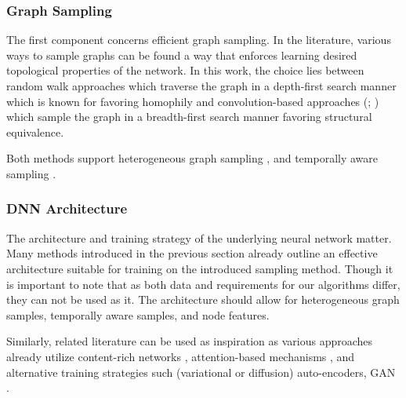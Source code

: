 \documentclass[
acmsmall,
nonacm,
screen,
acmthm]{../../scripts/pandoc/templates/acmart}
\begin{document}
\hypertarget{graph-sampling}{%
\subsubsection{Graph Sampling}\label{graph-sampling}}

The first component concerns efficient graph sampling. In the
literature, various ways to sample graphs can be found a way that
enforces learning desired topological properties of the network. In this
work, the choice lies between random walk approaches
\citep{perozziDeepWalkOnlineLearning2014, groverNode2vecScalableFeature2016, groverNode2vecScalableFeature2016}
which traverse the graph in a depth-first search manner which is known
for favoring homophily and convolution-based approaches
(\citet{kipfSemiSupervisedClassificationGraph2017a};
\citet{hamiltonInductiveRepresentationLearning2018}) which sample the
graph in a breadth-first search manner favoring structural equivalence.

Both methods support heterogeneous graph sampling
\citep{wuAuthor2VecFrameworkGenerating2020, yingGraphConvolutionalNeural2018, yangHeterogeneousNetworkRepresentation2020, dongMetapath2vecScalableRepresentation2017, wangHeterogeneousGraphAttention2021},
and temporally aware sampling
\citep{nguyenContinuousTimeDynamicNetwork2018, wuSageDyNovelSampling2021, dasguptaHyTEHyperplanebasedTemporally2018}.

\hypertarget{dnn-architecture}{%
\subsubsection{DNN Architecture}\label{dnn-architecture}}

The architecture and training strategy of the underlying neural network
matter. Many methods introduced in the previous section already outline
an effective architecture suitable for training on the introduced
sampling method. Though it is important to note that as both data and
requirements for our algorithms differ, they can not be used as it. The
architecture should allow for heterogeneous graph samples, temporally
aware samples, and node features.

Similarly, related literature can be used as inspiration as various
approaches already utilize content-rich networks
\citep{wuAuthor2VecFrameworkGenerating2020, yingGraphConvolutionalNeural2018},
attention-based mechanisms
\citep{abu-el-haijaWatchYourStep2018, sankarDynamicGraphRepresentation2019, wangHeterogeneousGraphAttention2021},
and alternative training strategies such (variational or diffusion)
auto-encoders, GAN
\citep{liVariationalDiffusionAutoencoders2020, kipfVariationalGraphAutoEncoders2016}.
\end{document}
